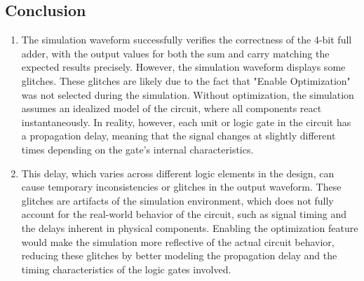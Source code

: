 \documentclass[]{article}
\begin{document}
\subsection{Conclusion}
\begin{enumerate}
    \item The simulation waveform successfully verifies the correctness of the 4-bit full adder, with the output values for both the sum and carry matching the expected results precisely. However, the simulation waveform displays some glitches. These glitches are likely due to the fact that "Enable Optimization" was not selected during the simulation. Without optimization, the simulation assumes an idealized model of the circuit, where all components react instantaneously. In reality, however, each unit or logic gate in the circuit has a propagation delay, meaning that the signal changes at slightly different times depending on the gate’s internal characteristics.

    \item This delay, which varies across different logic elements in the design, can cause temporary inconsistencies or glitches in the output waveform. These glitches are artifacts of the simulation environment, which does not fully account for the real-world behavior of the circuit, such as signal timing and the delays inherent in physical components. Enabling the optimization feature would make the simulation more reflective of the actual circuit behavior, reducing these glitches by better modeling the propagation delay and the timing characteristics of the logic gates involved.

\end{enumerate}
\end{document}
